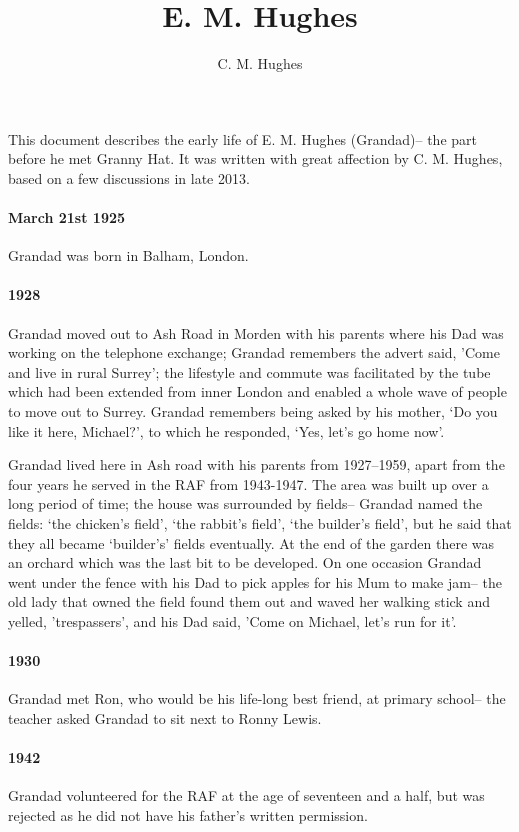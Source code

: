 \documentclass[11pt]{article}
\title{E. M. Hughes}
\author{C. M. Hughes}
\begin{document}
\maketitle

This document describes the early life of E. M. Hughes (Grandad)-- the part before he met Granny Hat. It was 
written with great affection by C. M. Hughes, based on a few discussions in late 2013.


\paragraph{March 21st 1925} Grandad was born in Balham, London.
  \paragraph{1928} Grandad moved out to Ash Road in Morden with his parents where his Dad was working on the telephone exchange;
    Grandad remembers the advert said, 'Come and live in rural Surrey'; the lifestyle and commute was facilitated 
by the tube which had been extended from inner London and enabled a whole
wave of people to move out to Surrey. Grandad remembers being asked by 
his mother, `Do you like it here, Michael?', to which he responded, `Yes, let's go home now'.

Grandad lived here in Ash road with his parents from 1927--1959, apart from the four years he served
 in the RAF from 1943-1947.  The area was built up over a long period of time;
the house was surrounded by fields-- Grandad named the fields: `the chicken's field', 
`the rabbit's field', `the builder's field', but he said that they all became `builder's' 
fields eventually. At the end of the garden there 
was an orchard which was the last bit to be developed. On one occasion Grandad went under the 
fence with his Dad to pick apples for his Mum to make jam-- the old lady that owned the field
found them out and waved her walking stick and yelled, 'trespassers', and his 
Dad said, 'Come on Michael, let's run for it'. 

\paragraph{1930} Grandad met Ron, who would be his life-long best friend, at primary 
school-- the teacher asked Grandad to sit next to Ronny Lewis.

\paragraph{1942} Grandad volunteered for the RAF at the age of seventeen and a half, but 
was rejected as he did not have his father's written permission. 
\end{document}
